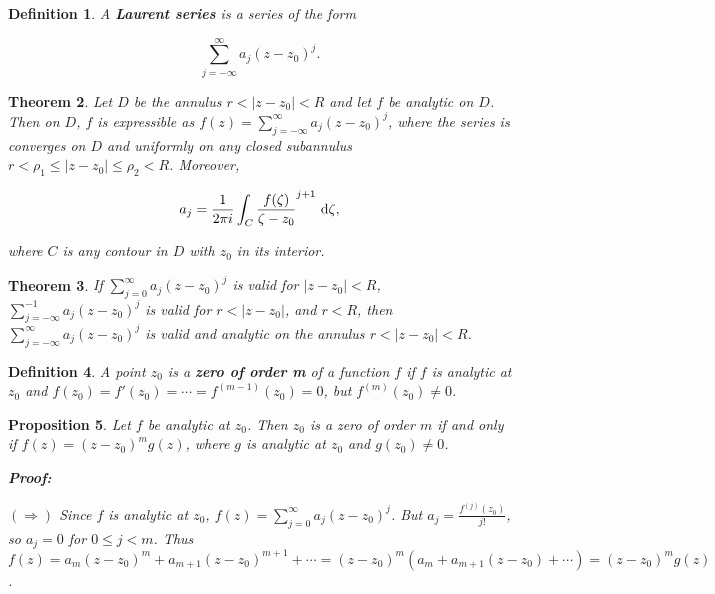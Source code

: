 \documentclass{article}
\theoremstyle{colontheorem}
\newtheorem{theorem}{Theorem}[section]
\newtheorem{proposition}[theorem]{Proposition}
\newtheorem{definition}[theorem]{Definition}
\newenvironment{Theorem}
{
	\begin{mdframed}[backgroundcolor=TheoremOrange!10]
	\begin{theorem}
}
{
	\end{theorem}
	\end{mdframed}
	
	\vspace{.15in}
}
\newenvironment{Proposition}
{
	\begin{mdframed}[backgroundcolor=TheoremOrange!10]
	\begin{proposition}
}
{
	\end{proposition}
	\end{mdframed}
	
	\vspace{.15in}
}
\newenvironment{Def}
{
	\begin{mdframed}[backgroundcolor=DefGreen!10]
	\begin{definition}
}
{
	\end{definition}
	\end{mdframed}
	
	\vspace{.15in}
}
\newenvironment{Proof}
{
	\begin{mdframed}[backgroundcolor=ProofPurple!10]
	\textbf{Proof:}%
}
{
	\end{mdframed}
	
	\vspace{.085in}
}
\begin{document}
\begin{Def}
	
	A \textbf{Laurent series} is a series of the form
	
	$$
		\sum\limits_{j=-\infty}^\infty a_j (z - z_0)^j.
	$$
	
\end{Def}



\begin{Theorem}
	
	Let $D$ be the annulus $r < |z - z_0| < R$ and let $f$ be analytic on $D$. Then on $D$, $f$ is expressible as $f(z) = \displaystyle\sum\limits_{j=-\infty}^\infty a_j (z - z_0)^j$, where the series is converges on $D$ and uniformly on any closed subannulus $r < \rho_1 \leq |z - z_0| \leq \rho_2 < R$. Moreover,
	
	$$
		a_j = \frac{1}{2 \pi i} \int_C \frac{f(\zeta)}{\zeta - z_0}^{j + 1}\ \textnormal{d}\zeta\textnormal{,}
	$$
	
	where $C$ is any contour in $D$ with $z_0$ in its interior.
	
\end{Theorem}



\begin{Theorem}
	
	If $\displaystyle\sum\limits_{j=0}^\infty a_j (z - z_0)^j$ is valid for $|z - z_0| < R$, $\displaystyle\sum\limits_{j=-\infty}^{-1} a_j (z - z_0)^j$ is valid for $r < |z - z_0|$, and $r < R$, then $\displaystyle\sum\limits_{j=-\infty}^\infty a_j (z - z_0)^j$ is valid and analytic on the annulus $r < |z - z_0| < R$.
	
\end{Theorem}



\begin{Def}
	
	A point $z_0$ is a \textbf{zero of order \emph{m}} of a function $f$ if $f$ is analytic at $z_0$ and $f(z_0) = f'(z_0) = \cdots = f^{(m-1)}(z_0) = 0$, but $f^{(m)}(z_0) \neq 0$.
	
\end{Def}



\begin{Proposition}
	
	Let $f$ be analytic at $z_0$. Then $z_0$ is a zero of order $m$ if and only if $f(z) = (z - z_0)^m g(z)$, where $g$ is analytic at $z_0$ and $g(z_0) \neq 0$.
	
	\begin{Proof}
		$(\Rightarrow)$ Since $f$ is analytic at $z_0$, $f(z) = \displaystyle\sum\limits_{j=0}^\infty a_j (z - z_0)^j$. But $a_j = \frac{f^{(j)}(z_0)}{j!}$, so $a_j = 0$ for $0 \leq j < m$. Thus $f(z) = a_m (z - z_0)^m + a_{m + 1} (z - z_0)^{m + 1} + \cdots = (z - z_0)^m (a_m + a_{m + 1} (z - z_0) + \cdots) = (z - z_0)^m g(z)$.
		
	\end{Proof}
	
\end{Proposition}
\end{document}
